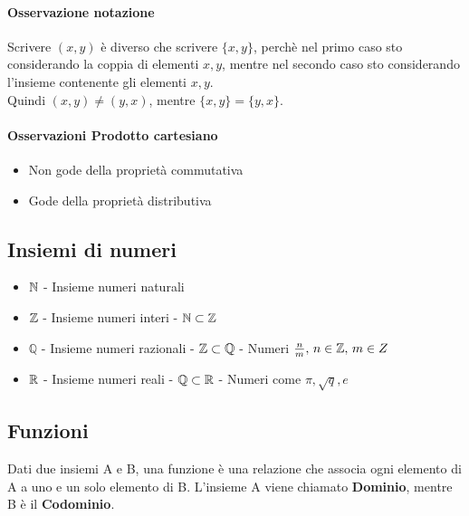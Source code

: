 \paragraph*{Osservazione notazione} Scrivere $(x, y)$ è diverso che scrivere $\{x, y\}$,
perchè nel primo caso sto considerando la coppia di elementi $x, y$, mentre nel 
secondo caso sto considerando l'insieme contenente gli elementi $x, y$.\\
Quindi $(x, y) \neq (y, x)$, mentre $\{x, y\} = \{y, x\}$.
\paragraph*{Osservazioni Prodotto cartesiano} 
\begin{itemize}
	\item Non gode della proprietà commutativa
	\item Gode della proprietà distributiva
\end{itemize}
\subsection{Insiemi di numeri}
\begin{itemize}
	\item $\mathbb{N}$ - Insieme numeri naturali
	\item $\mathbb{Z}$ - Insieme numeri interi - $\mathbb{N} \subset \mathbb{Z}$
	\item $\mathbb{Q} $ - Insieme numeri razionali - $\mathbb{Z} \subset \mathbb{Q} $ - Numeri $\frac{n}{m},
	 \, n \in \mathbb{Z}, \, m \in Z$
	\item $\mathbb{R}$ - Insieme numeri reali - $\mathbb{Q} \subset \mathbb{R}$ - Numeri come $\pi, \sqrt{q}, e$
\end{itemize}
\subsection{Funzioni}
Dati due insiemi A e B, una funzione è una relazione che associa ogni elemento di A a uno e
un solo elemento di B. L'insieme A viene chiamato \textbf{Dominio}, mentre B è il \textbf{Codominio}.
